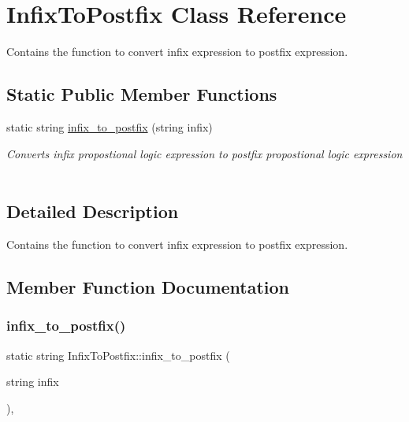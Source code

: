 \hypertarget{class_infix_to_postfix}{}\section{Infix\+To\+Postfix Class Reference}
\label{class_infix_to_postfix}


Contains the function to convert infix expression to postfix expression.  


\subsection*{Static Public Member Functions}
\begin{DoxyCompactItemize}
\item 
static string \mbox{\hyperlink{class_infix_to_postfix_a7206f78b3bb99dcba5bc4a8eb6fce5ad}{infix\+\_\+to\+\_\+postfix}} (string infix)
\begin{DoxyCompactList}\small\item\em Converts infix propostional logic expression to postfix propostional logic expression ~\newline
 \end{DoxyCompactList}\end{DoxyCompactItemize}


\subsection{Detailed Description}
Contains the function to convert infix expression to postfix expression. 

\subsection{Member Function Documentation}
\mbox{\label{class_infix_to_postfix_a7206f78b3bb99dcba5bc4a8eb6fce5ad}} 
\subsubsection{\texorpdfstring{infix\+\_\+to\+\_\+postfix()}{infix\_to\_postfix()}}
{\footnotesize\ttfamily static string Infix\+To\+Postfix\+::infix\+\_\+to\+\_\+postfix (\begin{DoxyParamCaption}\item[{string}]{infix }\end{DoxyParamCaption})\hspace{0.3cm}{\ttfamily [inline]}, {\ttfamily [static]}}



